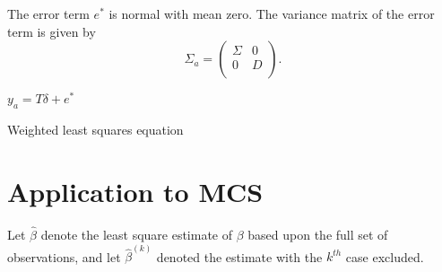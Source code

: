 \documentclass[12pt, a4paper]{article}
\begin{document}


The error term $e^{*}$ is normal with mean zero. The variance matrix of the error term is given by
\begin{equation}
\Sigma_{a} = \left(%
\begin{array}{cc}
\Sigma & 0 \\
0 & D \\
\end{array}%
\right).
\end{equation}

$y_{a} = T \delta + e^{*}$

Weighted least squares equation





	\section{Application to MCS} %
	
	
	Let $\hat{\beta}$ denote the least square estimate of $\beta$
	based upon the full set of observations, and let
	$\hat{\beta}^{(k)}$ denoted the estimate with the $k^{th}$ case
	excluded.
	
	
	
	
\end{document}
